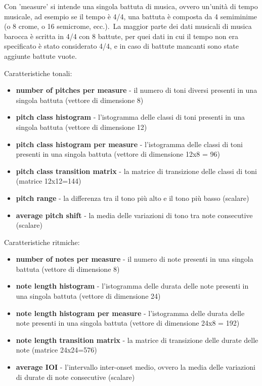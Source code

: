 Con 'measure' si intende una singola battuta di musica, ovvero un'unità di tempo musicale, ad esempio se il tempo è 4/4, una battuta è composta da 4 semiminime (o 8 crome, o 16 semicrome, ecc.).\
La maggior parte dei dati musicali di musica barocca è scritta in 4/4 con 8 battute, per quei dati in cui il tempo non era specificato è stato considerato 4/4, e in caso di battute mancanti sono state aggiunte battute vuote.\

Caratteristiche tonali:
\begin{itemize}
    \item \textbf{number of pitches per measure} - il numero di toni diversi presenti in una singola battuta (vettore di dimensione 8)
    \item \textbf{pitch class histogram} - l'istogramma delle classi di toni presenti in una singola battuta (vettore di dimensione 12)
    \item \textbf{pitch class histogram per measure} - l'istogramma delle classi di toni presenti in una singola battuta (vettore di dimensione 12x8 = 96)
    \item \textbf{pitch class transition matrix} - la matrice di transizione delle classi di toni (matrice 12x12=144)
    \item \textbf{pitch range} - la differenza tra il tono più alto e il tono più basso (scalare)
    \item \textbf{average pitch shift} - la media delle variazioni di tono tra note consecutive (scalare)
\end{itemize}

Caratteristiche ritmiche:
\begin{itemize}
    \item \textbf{number of notes per measure} - il numero di note presenti in una singola battuta (vettore di dimensione 8)
    \item \textbf{note length histogram} - l'istogramma delle durata delle note presenti in una singola battuta (vettore di dimensione 24)
    \item \textbf{note length histogram per measure} - l'istogramma delle durata delle note presenti in una singola battuta (vettore di dimensione 24x8 = 192)
    \item \textbf{note length transition matrix} - la matrice di transizione delle durate delle note (matrice 24x24=576)
    \item \textbf{average IOI} - l'intervallo inter-onset medio, ovvero la media delle variazioni di durate di note consecutive (scalare)
\end{itemize}


